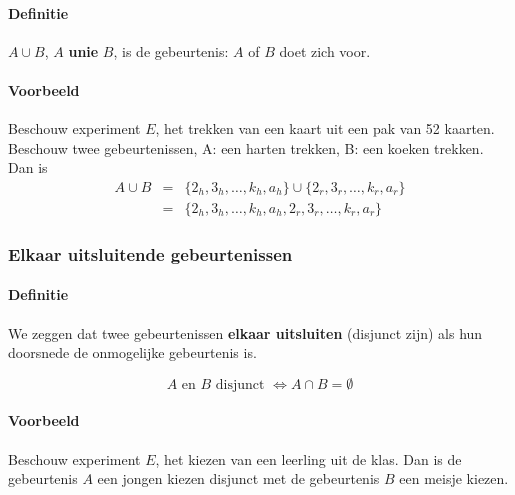 \documentclass[12pt,twoside]{article}
\begin{document}
\paragraph*{Definitie}
$A\cup B$, $A$ {\bf unie} $B$, is de gebeurtenis: $A$ of $B$ doet zich voor.

\paragraph*{Voorbeeld}
Beschouw experiment $E$, het trekken van een kaart uit een pak van 52 kaarten. Beschouw twee gebeurtenissen, A: een harten trekken, B: een koeken trekken. Dan is\\
\begin{eqnarray*}
A\cup B &=& \{2_h, 3_h, \ldots, k_h,a_h\}\cup\{2_r, 3_r, \ldots, k_r, a_r\}\\
        &=& \{2_h, 3_h, \ldots, k_h, a_h, 2_r, 3_r, \ldots, k_r, a_r\}
\end{eqnarray*}

\subsubsection{Elkaar uitsluitende gebeurtenissen}

\paragraph*{Definitie}
We zeggen dat twee gebeurtenissen {\bf elkaar uitsluiten} (disjunct zijn) als hun doorsnede
de onmogelijke gebeurtenis is.\\
\begin{mdframed}
$$A\mbox{ en }B\mbox{ disjunct }\Leftrightarrow A\cap B = \emptyset$$
\end{mdframed}

\paragraph*{Voorbeeld}
Beschouw experiment $E$, het kiezen van een leerling uit de klas. Dan is de gebeurtenis $A$ een jongen kiezen disjunct met de gebeurtenis $B$ een meisje kiezen.
\end{document}
